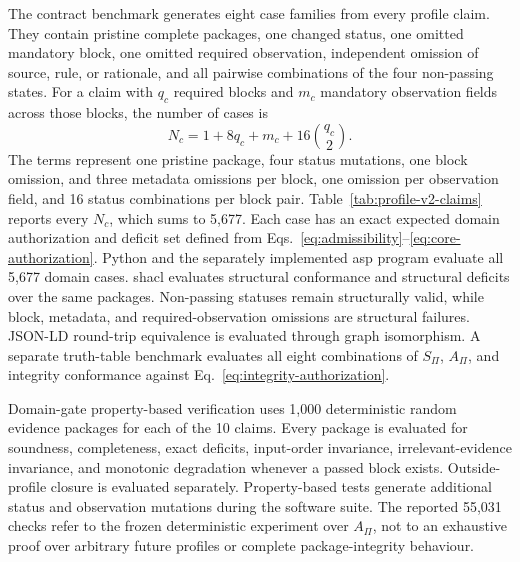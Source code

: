 The contract benchmark generates eight case families from every profile claim. They contain pristine complete packages, one changed status, one omitted mandatory block, one omitted required observation, independent omission of source, rule, or rationale, and all pairwise combinations of the four non-passing states. For a claim with $q_c$ required blocks and $m_c$ mandatory observation fields across those blocks, the number of cases is
\begin{equation}
N_c=1+8q_c+m_c+16\binom{q_c}{2}.
\label{eq:contract-case-count}
\end{equation}
The terms represent one pristine package, four status mutations, one block omission, and three metadata omissions per block, one omission per observation field, and 16 status combinations per block pair. Table~\ref{tab:profile-v2-claims} reports every $N_c$, which sums to 5,677. Each case has an exact expected domain authorization and deficit set defined from Eqs.~\ref{eq:admissibility}--\ref{eq:core-authorization}. Python and the separately implemented \ac{asp} program evaluate all 5,677 domain cases. \ac{shacl} evaluates structural conformance and structural deficits over the same packages. Non-passing statuses remain structurally valid, while block, metadata, and required-observation omissions are structural failures. JSON-LD round-trip equivalence is evaluated through graph isomorphism. A separate truth-table benchmark evaluates all eight combinations of $S_{\Pi}$, $A_{\Pi}$, and integrity conformance against Eq.~\ref{eq:integrity-authorization}.

Domain-gate property-based verification uses 1,000 deterministic random evidence packages for each of the 10 claims. Every package is evaluated for soundness, completeness, exact deficits, input-order invariance, irrelevant-evidence invariance, and monotonic degradation whenever a passed block exists. Outside-profile closure is evaluated separately. Property-based tests generate additional status and observation mutations during the software suite. The reported 55,031 checks refer to the frozen deterministic experiment over $A_{\Pi}$, not to an exhaustive proof over arbitrary future profiles or complete package-integrity behaviour.


